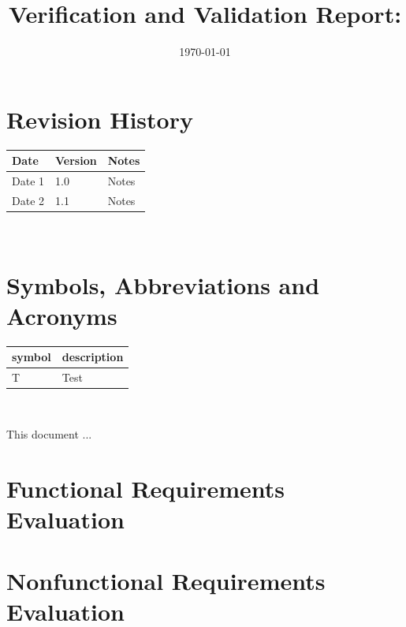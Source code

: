 \documentclass[12pt, titlepage]{article}
\begin{document}
\title{Verification and Validation Report: \progname} 
\author{\authname}
\date{\today}
	
\maketitle


\section{Revision History}

\begin{tabularx}{\textwidth}{p{3cm}p{2cm}X}
\toprule {\bf Date} & {\bf Version} & {\bf Notes}\\
\midrule
Date 1 & 1.0 & Notes\\
Date 2 & 1.1 & Notes\\
\bottomrule
\end{tabularx}

~\newpage

\section{Symbols, Abbreviations and Acronyms}

\renewcommand{\arraystretch}{1.2}
\begin{tabular}{l l} 
  \toprule		
  \textbf{symbol} & \textbf{description}\\
  \midrule 
  T & Test\\
  \bottomrule
\end{tabular}\\


\newpage

\tableofcontents

\listoftables %

\listoffigures %

\newpage


This document ...

\section{Functional Requirements Evaluation}

\section{Nonfunctional Requirements Evaluation}
\end{document}
